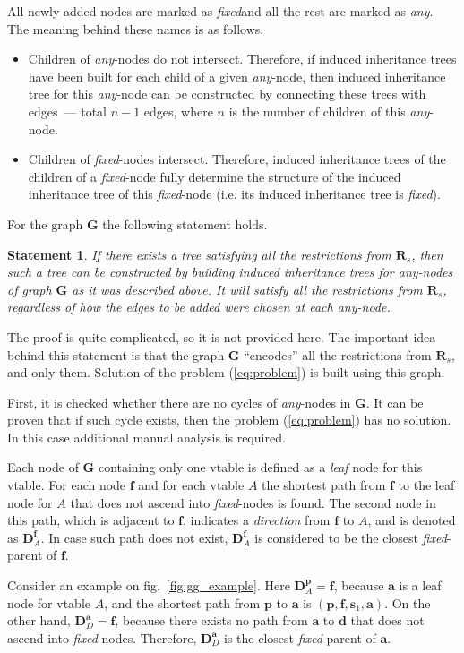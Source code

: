 \documentclass[10pt, conference]{IEEEtran}
\newcommand{\ib}[1]{\textbf{#1}}
\newcommand{\gD}{\ib{D}}
\newcommand{\gG}{\ib{G}}
\newcommand{\gR}{\ib{R}}
\newcommand{\gRs}{\gR_s}
\newcommand{\gf}{\ib{f}}
\newcommand{\gp}{\ib{p}}
\newcommand{\gs}{\ib{s}}
\newcommand{\ga}{\ib{a}}
\newcommand{\gd}{\ib{d}}
\newcommand{\any}{\textit{any}}
\newcommand{\fixed}{\textit{fixed}}
\newtheorem{statement}{Statement}
\newcommand{\compact}{}
\begin{document}
All newly added nodes are marked as \fixed and all the rest are marked as \any.
The meaning behind these names is as follows.
\begin{itemize}\compact
\item Children of \any-nodes do not intersect. Therefore, if induced inheritance trees
    have been built for each child of a given \any-node, then induced inheritance
    tree for this \any-node can be constructed by connecting these trees with edges~---
    total $n - 1$ edges, where $n$ is the number of children of this \any-node.
\item Children of \fixed-nodes intersect. Therefore, induced inheritance trees of the children
    of a \fixed-node fully determine the structure of the induced inheritance tree of
    this \fixed-node (i.e. its induced inheritance tree is \textit{fixed}).
\end{itemize}

For the graph $\gG$ the following statement holds.
\begin{statement}\label{theorem:evil}
If there exists a tree satisfying all the restrictions from {\em $\gRs$},
then such a tree can be constructed by building induced inheritance trees for
\any-nodes of graph {\em $\gG$} as it was described above. It will satisfy all
the restrictions from {\em $\gRs$}, regardless of how the edges to be added were
chosen at each \any-node.
\end{statement}
The proof is quite complicated, so it is not provided here.
The important idea behind this statement is that the graph $\gG$ ``encodes''
all the restrictions from $\gRs$, and only them.
Solution of the problem (\ref{eq:problem}) is built using this graph.

First, it is checked whether there are no cycles of \any-nodes in $\gG$.
It can be proven that if such cycle exists, then the problem (\ref{eq:problem})
has no solution. In this case additional manual analysis is required.

Each node of $\gG$ containing only one vtable is defined as a \textit{leaf} node
for this vtable. For each node $\gf$ and for each vtable $A$ the shortest
path from $\gf$ to the leaf node for $A$ that does not ascend into \fixed-nodes is found.
The second node in this path, which is adjacent to $\gf$, indicates a
\textit{direction} from $\gf$ to $A$, and is denoted as $\gD^{\gf}_A$. In case
such path does not exist, $\gD^{\gf}_A$ is considered to be the closest
\fixed-parent of $\gf$.

Consider an example on fig.~\ref{fig:gg_example}. Here $\gD^{\gp}_A = \gf$,
because $\ga$ is a leaf node for vtable $A$, and the shortest path from $\gp$
to $\ga$ is $(\gp, \gf, \gs_1, \ga)$. On the other hand, $\gD^{\ga}_D = \gf$,
because there exists no path from $\ga$ to $\gd$ that does not ascend into
\fixed-nodes. Therefore, $\gD^{\ga}_D$ is the closest \fixed-parent of $\ga$.
\end{document}
